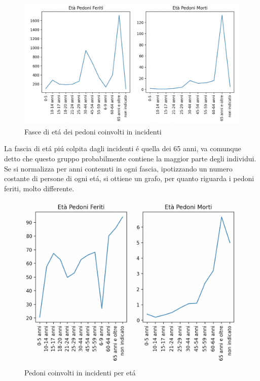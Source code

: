 \documentclass[a4paper]{report}
\begin{document}
\begin{figure}[!ht]
    \includegraphics[width=\linewidth]{../src/incidenti/incidenti_senza_coords/pedoni/eta_pedoni.png}
    \caption{Fasce di et\'a dei pedoni coinvolti in incidenti}
    \label{fig:eta_pedoni}
\end{figure}

La fascia di et\'a pi\'u colpita dagli incidenti \'e quella dei 65 anni, 
va comunque detto che questo gruppo probabilmente contiene la maggior parte degli individui.
Se si normalizza per anni contenuti in ogni fascia, ipotizzando un numero
costante di persone di ogni et\'a, si ottiene un grafo, per quanto riguarda i pedoni 
feriti, molto differente. 

\begin{figure}[!ht]
    \includegraphics[width=\linewidth]{../src/incidenti/incidenti_senza_coords/pedoni/eta_pedoni_norm.png}
    \caption{Pedoni coinvolti in incidenti per et\'a}
    \label{fig:sesso_morti_feriti}
\end{figure}
\end{document}
